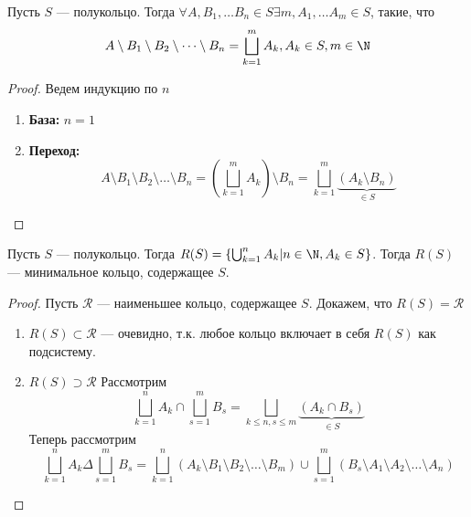 \begin{proposition}
    Пусть \(S\) --- полукольцо. Тогда \(\forall A, B_1, \dots B_n \in S \exists m, A_1, \dots A_m \in S\), такие, что
    \[A \setminus B_1 \setminus B_2 \setminus \dots \setminus B_n = \bigsqcup_{k = 1}^m A_k, A_k \in S, m \in \N\]
\end{proposition}
\begin{proof}
    Ведем индукцию по \(n\)
    \begin{enumerate}
        \item[] \textbf{База:} \(n = 1\)
        \item[] \textbf{Переход:}
        \[A \setminus B_1 \setminus B_2 \setminus \dots \setminus B_n = \left(\bigsqcup_{k = 1}^m A_k\right)\setminus B_n = \bigsqcup_{k = 1}^m \underbrace{(A_k \setminus B_n)}_{\in S}\]
    \end{enumerate}
\end{proof}

\begin{proposition}
    Пусть \(S\) --- полукольцо. Тогда \(R(S) = \left\{\bigcup_{k = 1}^n A_k | n \in \N, A_k \in S\right\}\). Тогда \(R(S)\) --- минимальное кольцо, содержащее \(S\).
\end{proposition}
\begin{proof}
    Пусть \(\mathcal{R}\) --- наименьшее кольцо, содержащее \(S\). Докажем, что \(R(S) = \mathcal{R}\)
    \begin{enumerate}
        \item [] \(R(S) \subset \mathcal{R}\) --- очевидно, т.к. любое кольцо включает в себя \(R(S)\) как подсистему.
        \item[]\(R(S) \supset \mathcal{R}\) Рассмотрим 
        \[\bigsqcup_{k = 1}^n A_k \cap \bigsqcup_{s = 1}^m B_s = \bigsqcup_{k \le n, s \le m} \underbrace{(A_k \cap B_s)}_{\in S}\]
        Теперь рассмотрим 
        \[\bigsqcup_{k = 1}^n A_k \Delta \bigsqcup_{s = 1}^m B_s = \bigsqcup_{k = 1}^n (A_k \setminus B_1 \setminus B_2 \setminus \dots \setminus B_m) \cup \bigsqcup_{s = 1}^m (B_s \setminus A_1 \setminus A_2 \setminus \dots \setminus A_n)\]
    \end{enumerate}
\end{proof}

